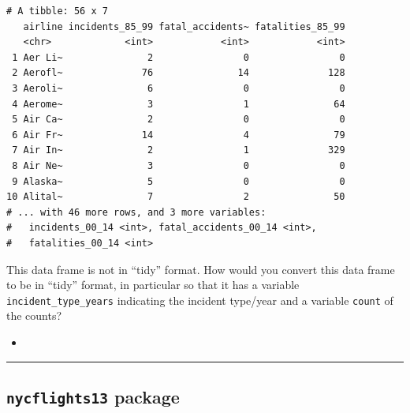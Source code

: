 \documentclass[12pt, krantz2,]{krantz}
\makeatletter
\newenvironment{Shaded}{\begin{snugshade}}{\end{snugshade}}
\newcommand{\KeywordTok}[1]{\textcolor[rgb]{0.27,0.27,0.27}{\textbf{#1}}}
\newcommand{\NormalTok}[1]{#1}
\newcommand{\OperatorTok}[1]{\textcolor[rgb]{0.43,0.43,0.43}{\textbf{#1}}}
\newcommand{\StringTok}[1]{\textcolor[rgb]{0.5,0.5,0.5}{#1}}
\newenvironment{kframe}{%
\medskip{}
\setlength{\fboxsep}{.8em}
 \def\at@end@of@kframe{}%
 \ifinner\ifhmode%
  \def\at@end@of@kframe{\end{minipage}}%
  \begin{minipage}{\columnwidth}%
 \fi\fi%
 \def\FrameCommand##1{\hskip\@totalleftmargin \hskip-\fboxsep
 \colorbox{shadecolor}{##1}\hskip-\fboxsep
     \hskip-\linewidth \hskip-\@totalleftmargin \hskip\columnwidth}%
 \MakeFramed {\advance\hsize-\width
   \@totalleftmargin\z@ \linewidth\hsize
   \@setminipage}}%
 {\par\unskip\endMakeFramed%
 \at@end@of@kframe}
\renewenvironment{Shaded}{\begin{kframe}}{\end{kframe}}
\newenvironment{rmdblock}[1]
  {\begin{shaded*}
  \begin{itemize}
  \renewcommand{\labelitemi}{
    \raisebox{-.7\height}[0pt][0pt]{
    }
  }
  \item
  }
  {
  \end{itemize}
  \end{shaded*}
  }
\newenvironment{learncheck}
  {\begin{rmdblock}{warning}}
  {\end{rmdblock}}
\makeatother
\begin{document}
\begin{Shaded}
\end{Shaded}

\begin{verbatim}
# A tibble: 56 x 7
   airline incidents_85_99 fatal_accidents~ fatalities_85_99
   <chr>             <int>            <int>            <int>
 1 Aer Li~               2                0                0
 2 Aerofl~              76               14              128
 3 Aeroli~               6                0                0
 4 Aerome~               3                1               64
 5 Air Ca~               2                0                0
 6 Air Fr~              14                4               79
 7 Air In~               2                1              329
 8 Air Ne~               3                0                0
 9 Alaska~               5                0                0
10 Alital~               7                2               50
# ... with 46 more rows, and 3 more variables:
#   incidents_00_14 <int>, fatal_accidents_00_14 <int>,
#   fatalities_00_14 <int>
\end{verbatim}

This data frame is not in ``tidy'' format. How would you convert this data frame to be in ``tidy'' format, in particular so that it has a variable \texttt{incident\_type\_years} indicating the incident type/year and a variable \texttt{count} of the counts?

\begin{learncheck}

\end{learncheck}

\begin{center}\rule{0.5\linewidth}{\linethickness}\end{center}

\hypertarget{nycflights13-package-1}{%
\subsection{\texorpdfstring{\texttt{nycflights13} package}{nycflights13 package}}\label{nycflights13-package-1}}
\end{document}
